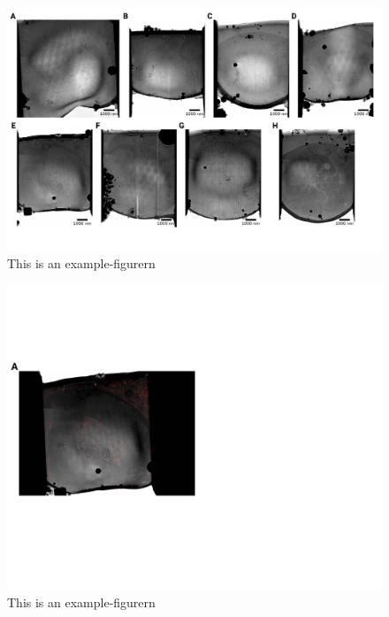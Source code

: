 \documentclass[
]{article}
\begin{document}
\begin{figure}
\hypertarget{fig:approach4}{%
\centering
\includegraphics{figures/example-figure4.pdf}
\caption{This is an example-figurern}\label{fig:approach4}
}
\end{figure}

\begin{figure}
\hypertarget{fig:matching}{%
\centering
\includegraphics{figures/matching.pdf}
\caption{This is an example-figurern}\label{fig:matching}
}
\end{figure}
\end{document}
